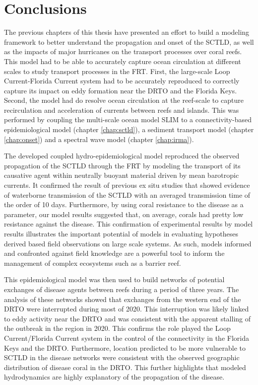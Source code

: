 \section{Conclusions}
The previous chapters of this thesis have presented an effort to build a modeling framework to better understand the propagation and onset of the SCTLD, as well as the impacts of major hurricanes on the transport processes over coral reefs. This model had to be able to accurately capture ocean circulation at different scales to study transport processes in the FRT. First, the large-scale Loop Current-Florida Current system had to be accurately reproduced to correctly capture its impact on eddy formation near the DRTO and the Florida Keys. Second, the model had do resolve ocean circulation at the reef-scale to capture recirculation and acceleration of currents between reefs and islands. This was performed by coupling the multi-scale ocean model SLIM to a connectivity-based epidemiological model (chapter \ref{chap:sctld}), a sediment transport model (chapter \ref{chap:onset}) and a spectral wave model (chapter \ref{chap:irma}).

The developed coupled hydro-epidemiological model reproduced the observed propagation of the SCTLD through the FRT by modeling the transport of its causative agent within neutrally buoyant material driven by mean barotropic currents. It confirmed the result of previous ex situ studies that showed evidence of waterborne transmission of the SCTLD with an averaged transmission time of the order of 10 days. Furthermore, by using coral resistance to the disease as a parameter, our model results suggested that, on average, corals had pretty low resistance against the disease. This confirmation of experimental results by model results illustrates the important potential of models in evaluating hypotheses derived based field observations on large scale systems. As such, models informed and confronted against field knowledge are a powerful tool to inform the management of complex ecosystems such as a barrier reef.

This epidemiological model was then used to build networks of potential exchanges of disease agents between reefs during a period of three years. The analysis of these networks showed that exchanges from the western end of the DRTO were interrupted during most of 2020. This interruption was likely linked to eddy activity near the DRTO and was consistent with the apparent stalling of the outbreak in the region in 2020. This confirms the role played the Loop Current/Florida Current system in the control of the connectivity in the Florida Keys and the DRTO. Furthermore, location predicted to be more vulnerable to SCTLD in the disease networks were consistent with the observed geographic distribution of disease coral in the DRTO. This further highlights that modeled hydrodynamics are highly explanatory of the propagation of the disease.


